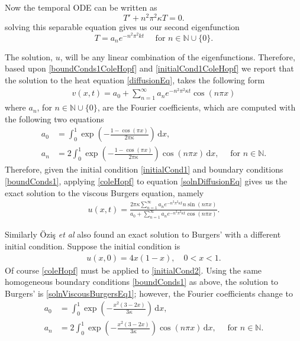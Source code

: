 \documentclass[undefended]{sfuthesis}
\begin{document}
Now the temporal ODE can be written as \[T' + n^2 \pi^2 \kappa T = 0.\] solving this separable equation gives us our second eigenfunction \[T = a_n e^{-n^2 \pi^2 k t} \quad \text{ for } n \in \mathbb{N} \cup \{0\}.\]

The solution, $u$, will be any linear combination of the eigenfunctions. Therefore, based upon \eqref{boundConds1ColeHopf} and \eqref{initialCond1ColeHopf} we report that the solution to the heat equation \eqref{diffusionEq}, takes the following form
\begin{align}
v(x, t) = a_0 + \sum_{n = 1}^{\infty} a_n e^{-n^2 \pi^2 \kappa t} \cos (n\pi x) \label{solnDiffusionEq}
\end{align}
where $a_n$, for $n \in \mathbb{N} \cup \{0\}$, are the Fourier coefficients, which are computed with the following two equations
\begin{align*}
a_0 &= \int_{0}^{1} \exp \left(-\frac{1 - \cos (\pi x)}{2 \pi \kappa}\right)\,\mathrm{d}x, \\
a_n &= 2\int_{0}^{1} \exp \left(-\frac{1 - \cos (\pi x)}{2 \pi \kappa}\right) \cos(n \pi x) \,\mathrm{d}x, \quad \text{ for } n \in \mathbb{N}.
\end{align*}
Therefore, given the initial condition \eqref{initialCond1} and boundary conditions \eqref{boundConds1}, applying \eqref{coleHopf} to equation \eqref{solnDiffusionEq} gives us the exact solution to the viscous Burgers equation, namely
\begin{align}
u(x, t) = \frac{2 \pi \kappa \sum\limits_{n = 1}^{\infty} a_n e^{-n^2 \pi^2 \kappa t} n \sin (n \pi x)}{a_0 + \sum\limits_{n = 1}^{\infty} a_n e^{- n^2 \pi^2 \kappa t} \cos (n \pi x)}. \label{solnViscousBurgersEq1}
\end{align}

Similarly \"Ozi\c{s} \textit{et al} also found an exact solution to Burgers' with a different initial condition. Suppose the initial condition is
\begin{align}
u(x, 0) = 4x(1 - x), \quad 0 < x < 1. \label{initialCond2}
\end{align}
Of course \eqref{coleHopf} must be applied to \eqref{initialCond2}. Using the same homogeneous boundary conditions \eqref{boundConds1} as above, the solution to Burgers' is \eqref{solnViscousBurgersEq1}; however, the Fourier coefficients change to 
\begin{align*}
a_0 &= \int_{0}^{1} \exp \left(-\frac{x^2 (3 - 2x)}{3 \kappa}\right)\,\mathrm{d}x,  \\
a_n &= 2\int_{0}^{1} \exp \left(-\frac{x^2 (3 - 2x)}{3 \kappa}\right) \cos(n \pi x) \,\mathrm{d}x, \quad \text{ for } n \in \mathbb{N}.  
\end{align*}
\end{document}
